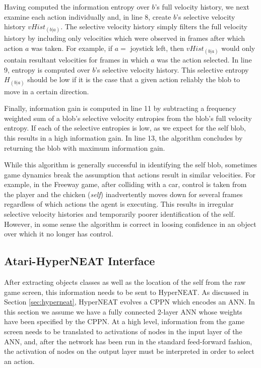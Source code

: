 \documentclass{acm_proc_article-sp}
\begin{document}
Having computed the information entropy over $b$'s full velocity history, we next examine each action individually and, in line 8, create $b$'s selective velocity history $vHist_{(b|a)}$. The selective velocity history simply filters the full velocity history by including only velocities which were observed in frames after which action $a$ was taken. For example, if $a = $ joystick left, then $vHist_{(b|a)}$ would only contain resultant velocities for frames in which $a$ was the action selected. In line 9, entropy is computed over $b$'s selective velocity history. This selective entropy $H_{(b|a)}$ should be low if it is the case that a given action reliably the blob to move in a certain direction.

Finally, information gain is computed in line 11 by subtracting a frequency weighted sum of a blob's selective velocity entropies from the blob's full velocity entropy. If each of the selective entropies is low, as we expect for the self blob, this results in a high information gain. In line 13, the algorithm concludes by returning the blob with maximum information gain.

While this algorithm is generally successful in identifying the self blob, sometimes game dynamics break the assumption that actions result in similar velocities. For example, in the Freeway game, after colliding with a car, control is taken from the player and the chicken (\textit{self}) inadvertently moves down for several frames regardless of which actions the agent is executing. This results in irregular selective velocity histories and temporarily poorer identification of the self. However, in some sense the algorithm is correct in loosing confidence in an object over which it no longer has control.

\subsection{Atari-HyperNEAT Interface}
\label{sec:interface}
After extracting objects classes as well as the location of the self from the raw game screen, this information needs to be sent to HyperNEAT. As discussed in Section \ref{sec:hyperneat}, HyperNEAT evolves a CPPN which encodes an ANN. In this section we assume we have a fully connected 2-layer ANN whose weights have been specified by the CPPN. At a high level, information from the game screen needs to be translated to activations of nodes in the input layer of the ANN, and, after the network has been run in the standard feed-forward fashion, the activation of nodes on the output layer must be interpreted in order to select an action.
\end{document}
